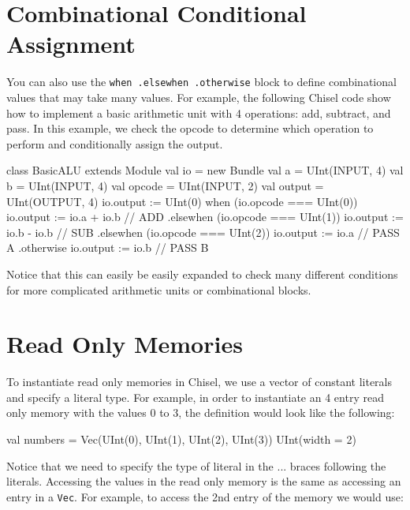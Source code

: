 \documentclass[twocolumn, 10pt]{article}
\begin{document}
\section{Combinational Conditional Assignment}

You can also use the \verb+when .elsewhen .otherwise+ block to define combinational values that may take many values. For example, the following Chisel code show how to implement a basic arithmetic unit with 4 operations: add, subtract, and pass. In this example, we check the opcode to determine which operation to perform and conditionally assign the output.

\begin{scala}
class BasicALU extends Module {
  val io = new Bundle {
    val a      = UInt(INPUT, 4)
    val b      = UInt(INPUT, 4)
    val opcode = UInt(INPUT, 2)
    val output = UInt(OUTPUT, 4)
  }
  io.output := UInt(0) 
  when (io.opcode === UInt(0)) {
    io.output := io.a + io.b   // ADD
  } .elsewhen (io.opcode === UInt(1)) {
    io.output := io.b - io.b   // SUB
  } .elsewhen (io.opcode === UInt(2)) {
    io.output := io.a  	       // PASS A
  } .otherwise {
    io.output := io.b          // PASS B
  }
}
\end{scala}

Notice that this can easily be easily expanded to check many different conditions for more complicated arithmetic units or combinational blocks.

\section{Read Only Memories}

To instantiate read only memories in Chisel, we use a vector of constant literals and specify a literal type. For example, in order to instantiate an 4 entry read only memory with the values 0 to 3, the definition would look like the following:

\begin{footnotesize}
\begin{scala}
val numbers = 
  Vec(UInt(0), UInt(1), UInt(2), UInt(3)){ UInt(width = 2) }
\end{scala}
\end{footnotesize}

Notice that we need to specify the type of literal in the {...} braces following the literals. Accessing the values in the read only memory is the same as accessing an entry in a \verb+Vec+. For example, to access the 2nd entry of the memory we would use:
\end{document}
